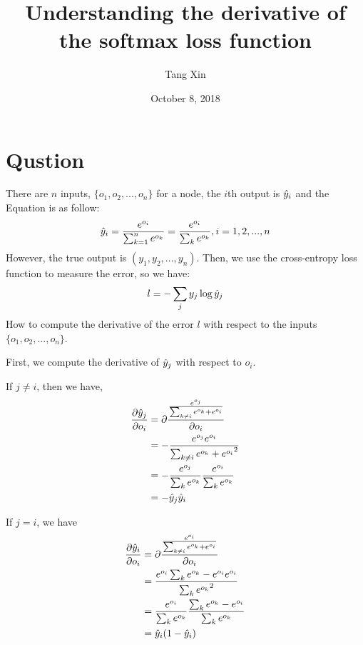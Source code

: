 \documentclass[a4paper]{article}
\title{Understanding the derivative of the softmax loss function}
\author{Tang Xin}
\date{October 8, 2018}
\begin{document}
\maketitle

\section{Qustion}

There are $n$ inputs, $\{o_1, o_2, ..., o_n\}$ for a node, the $i$th output is $\Hat{y}_i$ and the Equation is as follow:
\begin{equation}
\label{eq:softmax}
\Hat{y}_i = \frac{e^{o_i}}{\sum_{k=1}^{n}{e^{o_k}}} = \frac{e^{o_i}}{\sum_{k}{e^{o_k}}}, i = 1, 2, ...,n
\end{equation}
However, the true output is $(y_1, y_2,...,y_n)$. Then, we use the cross-entropy loss function to measure the error, so we have:
\begin{equation}
\label{eq:loss}
l = -\sum_{j}{y_j\log{\Hat{y}_j}}
\end{equation}
How to compute the derivative of the error $l$ with respect to the inputs $\{o_1,o_2,...,o_n\}$.

First, we compute the derivative of $\Hat{y}_j$ with respect to $o_i$.

If $j\ne i$, then we have,
\begin{equation}
\begin{split}
 \frac{\partial \Hat{y}_j}{\partial o_i} &=   \partial\frac{\frac{e^{o_j}}{\sum_{k\ne i}{e^{o_k}}+e^{o_i}}}{\partial o_i}     \\
 &= -\frac{e^{o_j}e^{o_i}}{{\sum_{k\ne i}{e^{o_k}}+e^{o_i}}^2}\\  
 & = -\frac{e^{o_j}}{\sum_{k}{e^{o_k}}}\frac{e^{o_i}}{\sum_{k}{e^{o_k}}} \\
 & =-\hat{y}_j\hat{y}_i \\
\end{split}
\end{equation}

If $j=i$, we have
\begin{equation}
\begin{split}
 \frac{\partial \Hat{y}_i}{\partial o_i} &=   \partial\frac{\frac{e^{o_i}}{\sum_{k\ne i}{e^{o_k}}+e^{o_i}}}{\partial o_i}     \\
 &= \frac{e^{o_i}\sum_{k}{e^{o_k}}-e^{o_i}e^{o_i}}{{{\sum_{k}{e^{o_k}}}^2}}\\  
 &= \frac{e^{o_i}}{\sum_{k}{e^{o_k}}}\frac{\sum_{k}{e^{o_k}}-e^{o_i}}{\sum_{k}{e^{o_k}}} \\
 & = \hat{y}_i(1-\hat{y}_i) \\
\end{split}
\end{equation}
  
\end{document}
